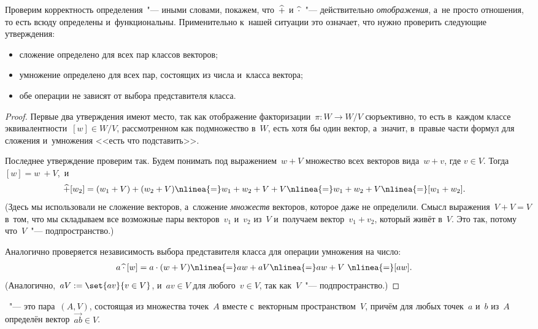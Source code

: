 	Проверим корректность определения~"--- иными словами, покажем, что~$\mathbin{\widehat{+}}$
	и~$\mathbin{\widehat{\cdot}}$~"--- действительно \emph{отображения}, а~не просто отношения, то
	есть всюду определены и~функциональны. Применительно к~нашей ситуации это
	означает, что нужно проверить следующие утверждения:
	\begin{itemize}
		\item сложение определено для всех пар классов векторов;
		\item умножение определено для всех пар, состоящих из числа и~класса
			вектора;
		\item обе операции не зависят от выбора представителя класса.
	\end{itemize}%

	\begin{proof}
		Первые два утверждения имеют место, так как отображение
		факторизации~$\pi \colon W \to W/V$ сюръективно, то есть в~каждом
		классе эквивалентности~$[w] \in W/V$, рассмотренном как подмножество
		в~$W$, есть хотя бы один вектор, а~значит, в~правые части формул для
		сложения и~умножения <<есть что подставить>>.

		Последнее утверждение проверим так. Будем понимать под выражением~$w +
		V$ множество всех векторов вида~$w + v$, где $v \in V$. Тогда $[w] =
		w~+ V$,~и
		\begin{align*}
			[w_1] \mhp [w_2] &=
			(w_1 + V) + (w_2 + V) 
			\nlinea{=}
			w_1 + w_2 + V + V 
			\nlinea{=}
			w_1 + w_2 + V 
			\nlinea{=}
			[w_1 + w_2]
			.
		\end{align*}
		(Здесь мы использовали не сложение векторов, а~сложение \emph{множеств}
		векторов, которое даже не определили. Смысл выражения~$V + V = V$
		в~том, что мы складываем все возможные пары векторов~$v_1$ и~$v_2$
		из~$V$ и~получаем вектор~$v_1 + v_2$, который живёт в~$V$. Это так,
		потому что~$V$~"--- подпространство.)

		Аналогично проверяется независимость выбора представителя класса для
		операции умножения на число:
		\begin{align*}
			a \mhc [w] &=
			a \cdot (w + V)
			\nlinea{=}
			aw + aV
			\nlinea{=}
			aw + V~\nlinea{=}
			[aw]
			.
		\end{align*}
		(Аналогично,~$aV := \set{av}{v \in V}$, и~$av \in V$ для любого~$v \in
		V$, так как~$V$~"--- подпространство.)%
	\end{proof}


	\begin{definition}
		~"--- это пара~$(A, V)$, состоящая из
		множества точек~$A$ вместе с~векторным пространством~$V$, причём для
		любых точек~$a$ и~$b$ из~$A$ определён вектор~$\vec{ab} \in V$.
		\label{<+label+>}
	\end{definition}

